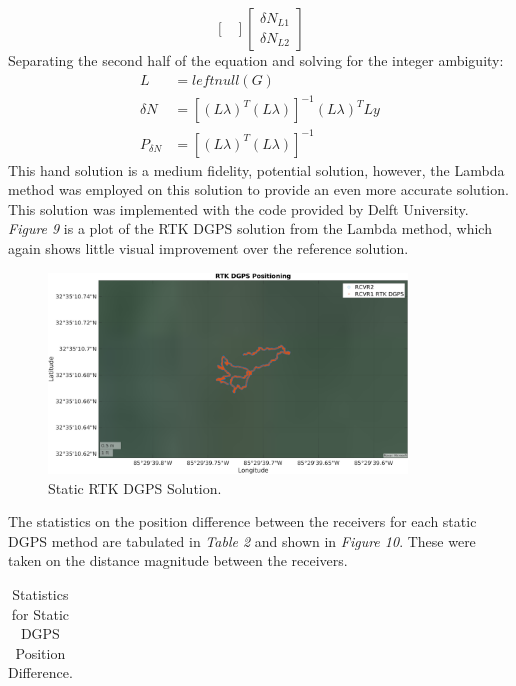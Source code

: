 \documentclass[11pt]{article}
\begin{document}
\begin{enumerate}[label=\textbf{\arabic*.}]
\begin{equation}
\begin{bmatrix}
      \end{bmatrix}
      \begin{bmatrix}
        \delta N_{L1} \\ \delta N_{L2}
      \end{bmatrix}
    \end{equation}
    Separating the second half of the equation and solving for the integer ambiguity:
    \begin{equation}
      \begin{split}
        L &= leftnull(G) \\
        \delta N &= [(L\lambda)^T(L\lambda)]^{-1}(L\lambda)^T Ly \\
        P_{\delta N} &= [(L\lambda)^T(L\lambda)]^{-1}
      \end{split}
    \end{equation}
    This hand solution is a medium fidelity, potential solution, however, the Lambda method 
    was employed on this solution to provide an even more accurate solution. This solution 
    was implemented with the code provided by Delft University. \emph{Figure 9} is a plot 
    of the RTK DGPS solution from the Lambda method, which again shows little visual 
    improvement over the reference solution.
    \begin{figure}[H]
      \centering
      \includegraphics[width=0.85\textwidth]{p2_d.png}
      \caption{Static RTK DGPS Solution.}
    \end{figure}
    The statistics on the position difference between the receivers for each static DGPS 
    method are tabulated in \emph{Table 2} and shown in \emph{Figure 10}. These were taken 
    on the distance magnitude between the receivers.
    \begin{table}[H]
      \centering
      \caption{Statistics for Static DGPS Position Difference.}
      \begin{tabular}{ P{5cm}|P{3cm} P{3cm} }

\end{tabular}
\end{table}
\end{enumerate}
\end{document}
